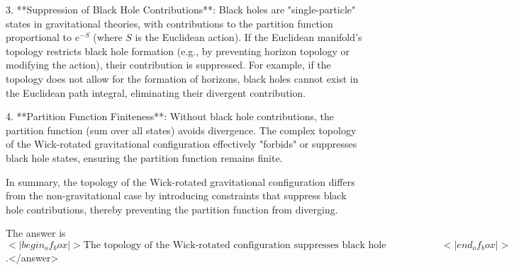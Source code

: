 3. **Suppression of Black Hole Contributions**:  
   Black holes are "single-particle" states in gravitational theories, with contributions to the partition function proportional to \(e^{-S}\) (where \(S\) is the Euclidean action). If the Euclidean manifold’s topology restricts black hole formation (e.g., by preventing horizon topology or modifying the action), their contribution is suppressed. For example, if the topology does not allow for the formation of horizons, black holes cannot exist in the Euclidean path integral, eliminating their divergent contribution.  

4. **Partition Function Finiteness**:  
   Without black hole contributions, the partition function (sum over all states) avoids divergence. The complex topology of the Wick-rotated gravitational configuration effectively "forbids" or suppresses black hole states, ensuring the partition function remains finite.  

In summary, the topology of the Wick-rotated gravitational configuration differs from the non-gravitational case by introducing constraints that suppress black hole contributions, thereby preventing the partition function from diverging.  

The answer is \(<|begin_of_box|>\text{The topology of the Wick-rotated configuration suppresses black hole contributions, making the partition function finite}<|end_of_box|>\).</answer>